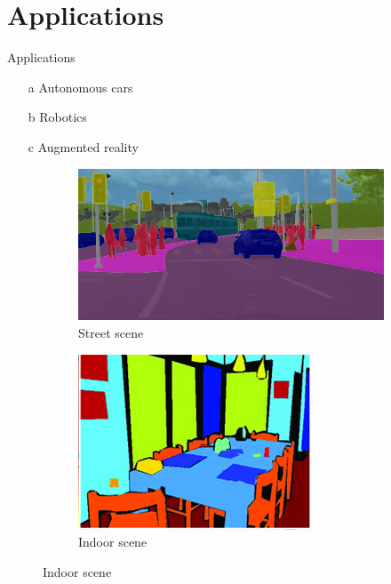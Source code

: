 \documentclass{beamer}
\begin{document}
\section{Applications}
\begin{frame}{Applications}
	\begin{itemize}
  \item[a] {
    Autonomous cars
  }
  \item[b] {
    Robotics
  }
  \item[c] {
    Augmented reality
  }
  \end{itemize}
  
  \begin{figure}
		\begin{subfigure}{0.3\textwidth}
			\centering
			\includegraphics[width=0.95\linewidth]{images/auto_driving}
			\captionsetup{justification=centering,margin=0.2cm}
			\caption{Street scene \cite{cityscapes}}
		\end{subfigure}
		\begin{subfigure}{0.3\textwidth}
			\centering
			\includegraphics[width=0.8\linewidth]{images/indoor}
			\captionsetup{justification=centering,margin=0.2cm}
			\caption{Indoor scene \cite{indoor}}

\end{subfigure}
\end{figure}
\end{frame}
\end{document}
